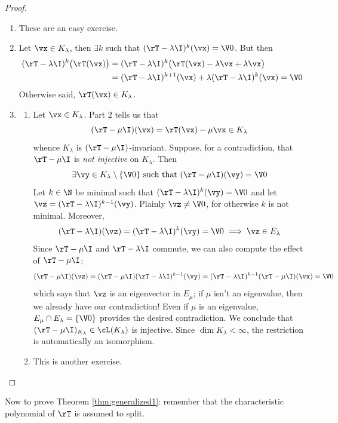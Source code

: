 \begin{proof}
\begin{enumerate}
  \item These are an easy exercise.
  
  \item Let $\vx\in K_\lambda$, then $\exists k$ such that $(\rT-\lambda \I)^k(\vx)=\V0$. But then
  \begin{align*}
  (\rT-\lambda \I)^k\bigl(\rT(\vx)\bigr)&=(\rT-\lambda \I)^{k}\bigl(\rT(\vx)-\lambda \vx+\lambda\vx\bigr)\\
  &=(\rT-\lambda \I)^{k+1}(\vx)+\lambda(\rT-\lambda \I)^k(\vx) =\V0
  \end{align*}
  Otherwise said, $\rT(\vx)\in K_\lambda$.
  
  \item\begin{enumerate}
    \item Let $\vx\in K_\lambda$. Part 2 tells us that
    \[(\rT-\mu\I)(\vx)=\rT(\vx)-\mu\vx\in K_\lambda\]
    whence $K_\lambda$ is $(\rT-\mu \I)$-invariant.\smallbreak
    Suppose, for a contradiction, that $\rT-\mu\I$ is \emph{not injective} on $K_\lambda$. Then
		\[\exists\vy\in K_\lambda\setminus\{\V0\}\text{ such that }(\rT-\mu \I)(\vy)=\V0\]
		Let $k\in\N$ be minimal such that $(\rT-\lambda \I)^k(\vy)=\V0$ and let $\vz=(\rT-\lambda \I)^{k-1}(\vy)$. Plainly $\vz\neq\V0$, for otherwise $k$ is not minimal. Moreover,
		\[(\rT-\lambda\I)(\vz)=(\rT-\lambda \I)^k(\vy)=\V0\implies \vz\in E_\lambda\]
		Since $\rT-\mu\I$ and $\rT-\lambda\I$ commute, we can also compute the effect of $\rT-\mu\I$;
		\[
		(\rT-\mu \I)(\vz)=(\rT-\mu\I)(\rT-\lambda \I)^{k-1}(\vy) =(\rT-\lambda \I)^{k-1}(\rT-\mu \I)(\vx)=\V0
		\]
		which says that $\vz$ is an eigenvector in $E_\mu$; if $\mu$ isn't an eigenvalue, then we already have our contradiction! Even if $\mu$ is an eigenvalue, $E_\mu\cap E_\lambda=\{\V0\}$ provides the desired contradiction.\smallbreak
		We conclude that $(\rT-\mu\I)_{K_\lambda}\in\cL(K_\lambda)$ is injective. Since $\dim K_\lambda<\infty$, the restriction is automatically an isomorphism.
		\item	This is another exercise.\qedhere
  \end{enumerate} 
\end{enumerate}
\end{proof}

\goodbreak

Now to prove Theorem \ref{thm:generalized1}: remember that the characteristic polynomial of $\rT$ is assumed to split.



